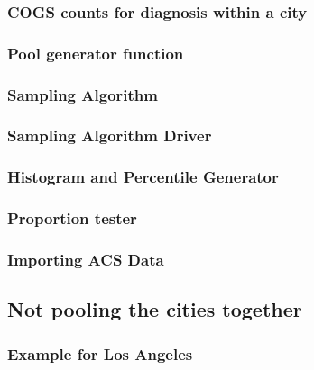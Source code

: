 \documentclass[
]{article}
\begin{document}
\hypertarget{cogs-counts-for-diagnosis-within-a-city}{%
\subsubsection{COGS counts for diagnosis within a
city}\label{cogs-counts-for-diagnosis-within-a-city}}

\hypertarget{pool-generator-function}{%
\subsubsection{Pool generator function}\label{pool-generator-function}}

\hypertarget{sampling-algorithm}{%
\subsubsection{Sampling Algorithm}\label{sampling-algorithm}}

\hypertarget{sampling-algorithm-driver}{%
\subsubsection{Sampling Algorithm
Driver}\label{sampling-algorithm-driver}}

\hypertarget{histogram-and-percentile-generator}{%
\subsubsection{Histogram and Percentile
Generator}\label{histogram-and-percentile-generator}}

\hypertarget{proportion-tester}{%
\subsubsection{Proportion tester}\label{proportion-tester}}

\hypertarget{importing-acs-data}{%
\subsubsection{Importing ACS Data}\label{importing-acs-data}}

\hypertarget{not-pooling-the-cities-together}{%
\subsection{Not pooling the cities
together}\label{not-pooling-the-cities-together}}

\hypertarget{example-for-los-angeles}{%
\subsubsection{Example for Los Angeles}\label{example-for-los-angeles}}
\end{document}
